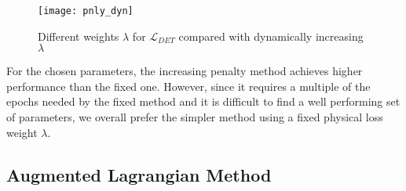 \begin{figure}[H]
	\texttt{[image: pnly\_dyn]}
	\caption{Different weights $\lambda$ for $\mathcal{L}_{DET}$ compared with dynamically increasing $\lambda$}
	\label{fig:pnly_dyn}
\end{figure}

For the chosen parameters, the increasing penalty method achieves higher performance than the fixed one. However, since it requires a multiple of the epochs needed by the fixed method and it is difficult to find a well performing set of parameters, we overall prefer the simpler method using a fixed physical loss weight $\lambda$.

\subsection{Augmented Lagrangian Method}

